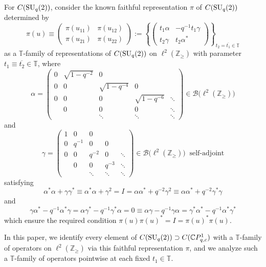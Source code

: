 \documentclass[pdftex]{sigma}
\begin{document}
For $C ( {\rm SU}_{q}(2) ) $, consider the known faithful
representation $\pi$ of $C ( {\rm SU}_{q}(2) ) $
determined by
\[
\pi(u) \equiv\left(
\begin{matrix}
\pi ( u_{11} ) & \pi ( u_{12} ) \\
\pi ( u_{21} ) & \pi ( u_{22} )
\end{matrix}
\right) :=\left\{ \left(
\begin{matrix}
t_{1}\alpha & -q^{-1}t_{1}\gamma\\
t_{2}\gamma & t_{2}\alpha^{\ast}%
\end{matrix}
\right) \right\} _{t_{2}=\overline{t_{1}}\in\mathbb{T}}%
\]
as a $\mathbb{T}$-family of representations of $C( {\rm SU}_{q}(2) ) $ on $\ell^{2} ( \mathbb{Z}_{\geq}) $ with
parameter $t_{1}\equiv\overline{t_{2}}\in\mathbb{T}$, where
\[
\alpha=\left(
\begin{matrix}
0 & \sqrt{1-q^{-2}} & 0 & & \\
0 & 0 & \sqrt{1-q^{-4}} & 0 & \\
0 & 0 & 0 & \sqrt{1-q^{-6}} & \ddots\\
& 0 & 0 & 0 & \ddots\\
& & \ddots & \ddots & \ddots
\end{matrix}
\right) \in\mathcal{B}\big( \ell^{2}( \mathbb{Z}_{\geq})\big)
\]
and
\[
\gamma=\left(
\begin{matrix}
1 & 0 & 0 & & \\
0 & q^{-1} & 0 & 0 & \\
0 & 0 & q^{-2} & 0 & \ddots\\
& 0 & 0 & q^{-3} & \ddots\\
& & \ddots & \ddots & \ddots
\end{matrix}
\right) \in\mathcal{B}\big( \ell^{2} ( \mathbb{Z}_{\geq} )
\big) \ \text{\ \ self-adjoint}
\]
satisfying
\[
\alpha^{\ast}\alpha+\gamma\gamma^{\ast}\equiv\alpha^{\ast}\alpha+\gamma
^{2}=I=\alpha\alpha^{\ast}+q^{-2}\gamma^{2}\equiv\alpha\alpha^{\ast}%
+q^{-2}\gamma^{\ast}\gamma
\]
and
\[
\gamma\alpha^{\ast}-q^{-1}\alpha^{\ast}\gamma=\alpha\gamma^{\ast}-q^{-1}%
\gamma^{\ast}\alpha=0\equiv\alpha\gamma-q^{-1}\gamma\alpha=\gamma^{\ast}%
\alpha^{\ast}-q^{-1}\alpha^{\ast}\gamma^{\ast}%
\]
which ensure the required condition $\pi(u) \pi(u)
^{\ast}=I=\pi(u) ^{\ast}\pi(u) $.

In this paper, we identify every element of $C( {\rm SU}_{q}(2)
) \supset C ( \mathbb{C}P_{q,c}^{1} ) $ with a $\mathbb{T}$-family of operators on $\ell^{2} ( \mathbb{Z}_{\geq} ) $ via this
faithful representation $\pi$, and we analyze such a $\mathbb{T}$-family of
operators pointwise at each fixed $t_{1}\in\mathbb{T}$.
\end{document}
